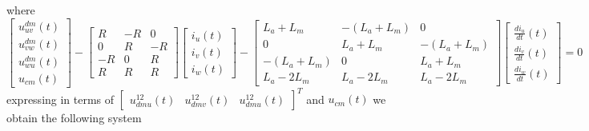 \documentclass[11pt,a4paper]{scrartcl}
\begin{document}
\begin{onehalfspace}
\begin{equation}
	\end{equation}
	where
	\begin{equation}
		\begin{bmatrix} u^{dm}_{uv}(t) \\[6pt] u^{dm}_{vw}(t) \\[6pt] u^{dm}_{wu}(t) \\[6pt] u_{cm}(t) \end{bmatrix} - \begin{bmatrix} R & -R & 0 \\ 0 & R & -R \\ -R & 0 & R \\ R & R & R \end{bmatrix} \begin{bmatrix} i_u(t) \\ i_v(t) \\ i_w(t) \end{bmatrix} - \begin{bmatrix} L_a+L_m & -(L_a+L_m) & 0 \\ 0 & L_a+L_m & -(L_a+L_m) \\ -(L_a+L_m) & 0 & L_a+L_m \\ L_a-2L_m & L_a-2L_m & L_a-2L_m \end{bmatrix} \begin{bmatrix} \frac{di_u}{dt}(t) \\ \frac{di_v}{dt}(t) \\ \frac{di_w}{dt}(t) \end{bmatrix} = 0
	\end{equation}
	expressing in terms of $\begin{bmatrix} u^{12}_{dmu}(t) & u^{12}_{dmv}(t) & u^{12}_{dmu}(t) \end{bmatrix}^{T}$ and $u_{cm}(t)$ we obtain the following system
	

\end{onehalfspace}
\end{document}
